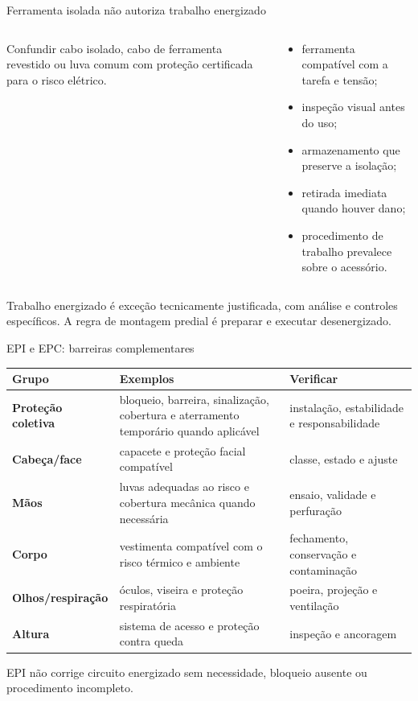 \begin{frame}{Ferramenta isolada não autoriza trabalho energizado}
\small
\begin{columns}[T,onlytextwidth]
\begin{caixaAt}[title=Erro perigoso]
Confundir cabo isolado, cabo de ferramenta revestido ou luva comum com proteção certificada para o risco elétrico.
\end{caixaAt}
\begin{caixaNorma}[title=Uso correto]
\begin{itemize}
\item ferramenta compatível com a tarefa e tensão;
\item inspeção visual antes do uso;
\item armazenamento que preserve a isolação;
\item retirada imediata quando houver dano;
\item procedimento de trabalho prevalece sobre o acessório.
\end{itemize}
\end{caixaNorma}
\end{columns}
\begin{caixaObs}
Trabalho energizado é exceção tecnicamente justificada, com análise e controles específicos. A regra de montagem predial é preparar e executar desenergizado.
\end{caixaObs}
\end{frame}

\begin{frame}{EPI e EPC: barreiras complementares}
\small
\begin{tabularx}{\textwidth}{>{\bfseries}p{2.7cm}X X}
\toprule
Grupo & Exemplos & Verificar \\
\midrule
Proteção coletiva & bloqueio, barreira, sinalização, cobertura e aterramento temporário quando aplicável & instalação, estabilidade e responsabilidade \\
Cabeça/face & capacete e proteção facial compatível & classe, estado e ajuste \\
Mãos & luvas adequadas ao risco e cobertura mecânica quando necessária & ensaio, validade e perfuração \\
Corpo & vestimenta compatível com o risco térmico e ambiente & fechamento, conservação e contaminação \\
Olhos/respiração & óculos, viseira e proteção respiratória & poeira, projeção e ventilação \\
Altura & sistema de acesso e proteção contra queda & inspeção e ancoragem \\
\bottomrule
\end{tabularx}
\begin{caixaAt}
EPI não corrige circuito energizado sem necessidade, bloqueio ausente ou procedimento incompleto.
\end{caixaAt}
\end{frame}

